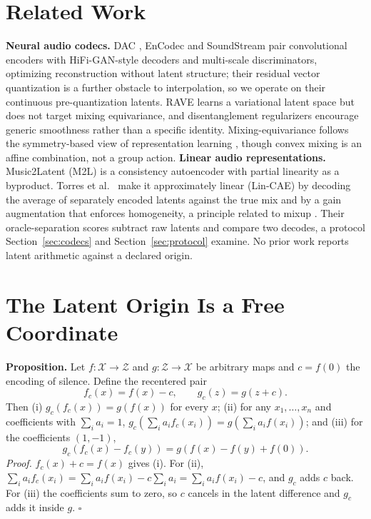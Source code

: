 \documentclass[conference]{IEEEtran}
\newcommand{\secref}[1]{Section~\ref{#1}}
\begin{document}
\section{Related Work}\label{sec:related}
\textbf{Neural audio codecs.} DAC \cite{kumar2024dac}, EnCodec
\cite{defossez2023encodec} and SoundStream \cite{zeghidour2022soundstream}
pair convolutional encoders with HiFi-GAN-style decoders \cite{kong2020hifigan}
and multi-scale discriminators, optimizing reconstruction without latent
structure; their residual vector quantization is a further obstacle to
interpolation, so we operate on their continuous pre-quantization latents.
RAVE \cite{caillon2021rave} learns a variational latent space but does not
target mixing equivariance, and disentanglement regularizers
\cite{higgins2017betavae} encourage generic smoothness rather than a specific
identity. Mixing-equivariance follows the symmetry-based view of
representation learning \cite{higgins2018towards}, though convex mixing is an
affine combination, not a group action.
\textbf{Linear audio representations.} Music2Latent (M2L)
\cite{pasini2024music2latent} is a consistency autoencoder with partial
linearity as a byproduct. Torres et al.~\cite{torres2026linearity} make it
approximately linear (Lin-CAE) by decoding the average of separately encoded
latents against the true mix and by a gain augmentation that enforces
homogeneity, a principle related to mixup \cite{zhang2018mixup}. Their
oracle-separation scores subtract raw latents and compare two decodes, a
protocol \secref{sec:codecs} and \secref{sec:protocol} examine. No prior work
reports latent arithmetic against a declared origin.

\section{The Latent Origin Is a Free Coordinate}\label{sec:origin}
\noindent\textbf{Proposition.} Let $f:\mathcal{X}\to\mathcal{Z}$ and
$g:\mathcal{Z}\to\mathcal{X}$ be arbitrary maps and $c=f(0)$ the encoding of
silence. Define the recentered pair
\begin{equation}
  f_c(x)=f(x)-c, \qquad g_c(z)=g(z+c).
  \label{eq:recenter}
\end{equation}
Then (i) $g_c(f_c(x))=g(f(x))$ for every $x$; (ii) for any $x_1,\dots,x_n$
and coefficients with $\sum_i a_i=1$,
$g_c(\sum_i a_i f_c(x_i))=g(\sum_i a_i f(x_i))$; and (iii) for the
coefficients $(1,-1)$,
\begin{equation}
  g_c\!\left(f_c(x)-f_c(y)\right)=g\!\left(f(x)-f(y)+f(0)\right).
  \label{eq:sub}
\end{equation}
\emph{Proof.} $f_c(x)+c=f(x)$ gives (i). For (ii),
$\sum_i a_i f_c(x_i)=\sum_i a_i f(x_i)-c\sum_i a_i=\sum_i a_i f(x_i)-c$, and
$g_c$ adds $c$ back. For (iii) the coefficients sum to zero, so $c$ cancels
in the latent difference and $g_c$ adds it inside $g$. $\square$
\end{document}
